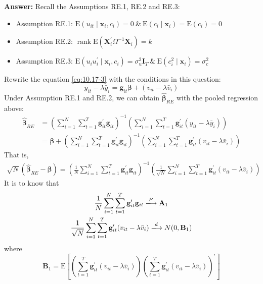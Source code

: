 \begin{enumerate}
\begin{enumerate}
        \textbf{Answer:} Recall the Assumptions RE.1, RE.2 and RE.3:
        \begin{itemize}
            \item Assumption RE.1: $\mathrm{E}(u_{it} \mid \mathbf{x}_i,c_i) = 0\ \&\ \mathrm{E}(c_i \mid \mathbf{x}_i) = \mathrm{E}(c_i) = 0$
            \item Assumption RE.2: $\operatorname{rank} \mathrm{E}\left( \mathbf{X}_i^\prime \Omega^{-1} \mathbf{X}_i \right) = k$
            \item Assumption RE.3: $\mathrm{E}(u_i u_i^\prime \mid \mathbf{x}_i,c_i) = \sigma_u^2 \mathbf{I}_T \ \&\ \mathrm{E}(c_i^2 \mid \mathbf{x}_i) = \sigma_c^2$
        \end{itemize}
        Rewrite the equation \eqref{eq:10.17-3} with the conditions in this question: 
        \[ y_{it}-\lambda \bar{y}_{i}= \mathbf{g}_{it}\bm{\beta} +\left(v_{i t}-\lambda \bar{v}_{i}\right) \]
        Under Assumption RE.1 and RE.2, we can obtain $\hat{\bm{\beta}}_{RE}$ with the pooled regression above:
        \begin{align*}
            \hat{\bm{\beta}}_{RE} &= \left( \sum_{i=1}^N \sum_{t=1}^T \mathbf{g}_{it}^\prime \mathbf{g}_{it} \right)^{-1} \left( \sum_{i=1}^N \sum_{t=1}^T \mathbf{g}_{it}^\prime (y_{it} - \lambda\bar{y}_i) \right) \\
            &= \bm{\beta} + \left( \sum_{i=1}^N \sum_{t=1}^T \mathbf{g}_{it}^\prime \mathbf{g}_{it} \right)^{-1} \left( \sum_{i=1}^N \sum_{t=1}^T \mathbf{g}_{it}^\prime (v_{i t}-\lambda \bar{v}_{i}) \right)
        \end{align*}
        That is,
        \begin{gather}
            \sqrt{N}\left( \hat{\bm{\beta}}_{RE} - \bm{\beta} \right) = \left( \frac{1}{N} \sum_{i=1}^N \sum_{t=1}^T \mathbf{g}_{it}^\prime \mathbf{g}_{it} \right)^{-1} \left( \frac{1}{\sqrt{N}}\sum_{i=1}^N \sum_{t=1}^T \mathbf{g}_{it}^\prime (v_{i t}-\lambda \bar{v}_{i}) \right) \label{eq:10.17-4}
        \end{gather}
        It is to know that
        \begin{gather*}
            \frac{1}{N} \sum_{i=1}^N \sum_{t=1}^T \mathbf{g}_{it}^\prime \mathbf{g}_{it} \xlongrightarrow{P} \mathbf{A}_1 \\
            \frac{1}{\sqrt{N}}\sum_{i=1}^N \sum_{t=1}^T \mathbf{g}_{it}^\prime (v_{i t}-\lambda \bar{v}_{i}) \xlongrightarrow{d} N(0,\mathbf{B}_1)
        \end{gather*}
        where
        \[ \mathbf{B}_1 = \mathrm{E}\left[ \left( \sum_{t=1}^T \mathbf{g}_{it}^\prime (v_{i t}-\lambda \bar{v}_{i}) \right)  \left( \sum_{t=1}^T \mathbf{g}_{it}^\prime (v_{i t}-\lambda \bar{v}_{i}) \right)^\prime \right] \]

\end{enumerate}
\end{enumerate}
